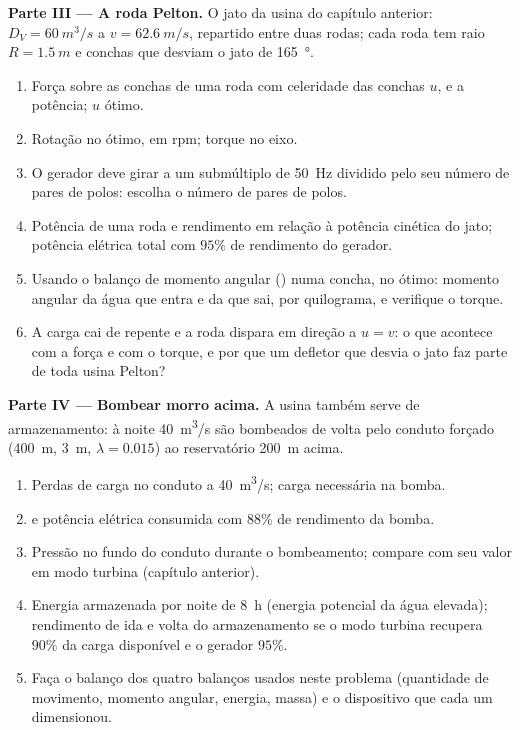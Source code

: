 \begin{problem}
\medskip
\noindent\textbf{Parte III --- A roda Pelton.}
O jato da usina do capítulo anterior: $D_V = \qty{60}{m^3/s}$ a $v =
\qty{62.6}{m/s}$, repartido entre duas rodas; cada roda tem raio $R =
\qty{1.5}{m}$ e conchas que desviam o jato de \qty{165}{\degree}.
\begin{enumerate}[resume]
  \item Força sobre as conchas de uma roda com celeridade das conchas $u$, e a
        potência; $u$ ótimo.
  \item Rotação no ótimo, em rpm; torque no eixo.
  \item O gerador deve girar a um submúltiplo de \qty{50}{Hz} dividido pelo
        seu número de pares de polos: escolha o número de pares de polos.
  \item Potência de uma roda e rendimento em relação à potência
        cinética do jato; potência elétrica total com $95\%$ de rendimento
        do gerador.
  \item Usando o balanço de momento angular ()
        numa concha, no ótimo: momento angular da água que
        entra e da que sai, por quilograma, e verifique o torque.
  \item A carga cai de repente e a roda dispara em direção a $u =
        v$: o que acontece com a força e com o torque, e por que um
        defletor que desvia o jato faz parte de toda usina Pelton?
\end{enumerate}

\medskip
\noindent\textbf{Parte IV --- Bombear morro acima.}
A usina também serve de armazenamento: à noite \qty{40}{m^3/s} são bombeados
de volta pelo conduto forçado (\qty{400}{m}, \qty{3}{m}, $\lambda = 0.015$) ao
reservatório \qty{200}{m} acima.
\begin{enumerate}[resume]
  \item Perdas de carga no conduto a \qty{40}{m^3/s}; carga necessária na bomba.
  \item {} e potência elétrica consumida com $88\%$ de rendimento
        da bomba.
  \item Pressão no fundo do conduto durante o bombeamento; compare
        com seu valor em modo turbina (capítulo anterior).
  \item Energia armazenada por noite de \qty{8}{h} (energia potencial da
        água elevada); rendimento de ida e volta do armazenamento se o
        modo turbina recupera $90\%$ da carga disponível e o
        gerador $95\%$.
  \item Faça o balanço dos quatro balanços usados neste problema (quantidade de movimento, momento
        angular, energia, massa) e o dispositivo que cada um dimensionou.
\end{enumerate}
\end{problem}
